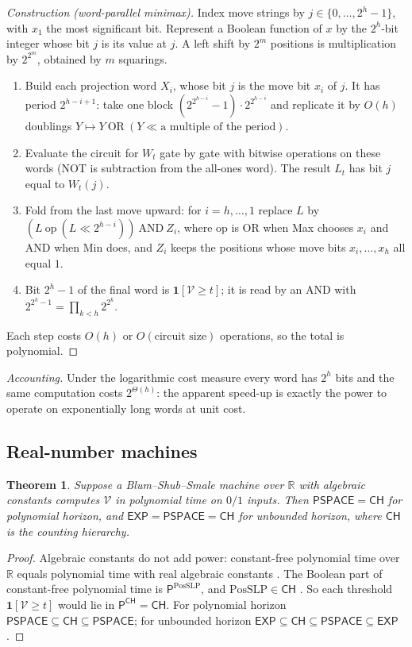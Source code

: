 \documentclass[11pt]{amsart}
\theoremstyle{plain}
\newtheorem{theorem}{Theorem}[section]
\theoremstyle{definition}
\theoremstyle{remark}
\numberwithin{equation}{section}
\newcommand{\RR}{\mathbb{R}}
\newcommand{\val}{\mathcal{V}}            %
\newcommand{\cls}[1]{\mathsf{#1}}
\newcommand{\PSPACE}{\cls{PSPACE}}
\newcommand{\EXP}{\cls{EXP}}
\newcommand{\Pclass}{\cls{P}}
\newcommand{\CH}{\cls{CH}}
\newcommand{\one}{\mathbf{1}}
\begin{document}
\begin{proof}[Construction \textup{(word-parallel minimax)}]
Index move strings by $j\in\{0,\dots,2^h-1\}$, with $x_1$ the most significant bit. Represent a Boolean function of $x$ by the $2^h$-bit integer whose bit $j$ is its value at $j$. A left shift by $2^m$ positions is multiplication by $2^{2^m}$, obtained by $m$ squarings.
\begin{enumerate}[label=\arabic*.]
\item Build each projection word $X_i$, whose bit $j$ is the move bit $x_i$ of $j$. It has period $2^{h-i+1}$: take one block $(2^{2^{h-i}}-1)\cdot2^{2^{h-i}}$ and replicate it by $O(h)$ doublings $Y\mapsto Y\ \mathrm{OR}\ (Y\ll \text{a multiple of the period})$.
\item Evaluate the circuit for $W_t$ gate by gate with bitwise operations on these words (NOT is subtraction from the all-ones word). The result $L_t$ has bit $j$ equal to $W_t(j)$.
\item Fold from the last move upward: for $i=h,\dots,1$ replace $L$ by $(L\ \mathrm{op}\ (L\ll 2^{h-i}))\ \mathrm{AND}\ Z_i$, where op is OR when Max chooses $x_i$ and AND when Min does, and $Z_i$ keeps the positions whose move bits $x_i,\dots,x_h$ all equal $1$.
\item Bit $2^h-1$ of the final word is $\one[\val\ge t]$; it is read by an AND with $2^{2^h-1}=\prod_{k<h}2^{2^k}$.
\end{enumerate}
Each step costs $O(h)$ or $O(\text{circuit size})$ operations, so the total is polynomial.
\end{proof}

\noindent\emph{Accounting.} Under the logarithmic cost measure every word has $2^h$ bits and the same computation costs $2^{\Theta(h)}$: the apparent speed-up is exactly the power to operate on exponentially long words at unit cost.

\subsection{Real-number machines}
\begin{theorem}\label{thm:bss}
Suppose a Blum--Shub--Smale machine over $\RR$ with algebraic constants computes $\val$ in polynomial time on $0/1$ inputs. Then $\PSPACE=\CH$ for polynomial horizon, and $\EXP=\PSPACE=\CH$ for unbounded horizon, where $\CH$ is the counting hierarchy.
\end{theorem}

\begin{proof}
Algebraic constants do not add power: constant-free polynomial time over $\RR$ equals polynomial time with real algebraic constants \cite{ChapuisKoiran}. The Boolean part of constant-free polynomial time is $\Pclass^{\mathrm{PosSLP}}$, and $\mathrm{PosSLP}\in\CH$ \cite{ABKM}. So each threshold $\one[\val\ge t]$ would lie in $\Pclass^{\CH}=\CH$. For polynomial horizon $\PSPACE\subseteq\CH\subseteq\PSPACE$; for unbounded horizon $\EXP\subseteq\CH\subseteq\PSPACE\subseteq\EXP$.
\end{proof}
\end{document}
